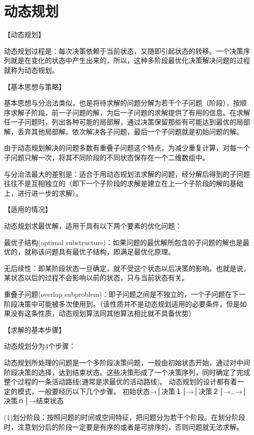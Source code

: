 \chapter{动态规划}

【动态规划】

动态规划过程是：每次决策依赖于当前状态，又随即引起状态的转移。一个决策序列就是在变化的状态中产生出来的，所以，这种多阶段最优化决策解决问题的过程就称为动态规划。

【基本思想与策略】

基本思想与分治法类似，也是将待求解的问题分解为若干个子问题（阶段），按顺序求解子阶段，前一子问题的解，为后一子问题的求解提供了有用的信息。在求解任一子问题时，列出各种可能的局部解，通过决策保留那些有可能达到最优的局部解，丢弃其他局部解。依次解决各子问题，最后一个子问题就是初始问题的解。

由于动态规划解决的问题多数有重叠子问题这个特点，为减少重复计算，对每一个子问题只解一次，将其不同阶段的不同状态保存在一个二维数组中。

与分治法最大的差别是：适合于用动态规划法求解的问题，经分解后得到的子问题往往不是互相独立的（即下一个子阶段的求解是建立在上一个子阶段的解的基础上，进行进一步的求解）。

【适用的情况】

动态规划求最优解，适用于具有以下两个要素的优化问题：
\begindot
\item 最优子结构(optimal substructure)：如果问题的最优解所包含的子问题的解也是最优的，就称该问题具有最优子结构，即满足最优化原理。
\item 无后续性：即某阶段状态一旦确定，就不受这个状态以后决策的影响。也就是说，某状态以后的过程不会影响以前的状态，只与当前状态有关。
\item 重叠子问题(overlap subproblem)：即子问题之间是不独立的，一个子问题在下一阶段决策中可能被多次使用到。（该性质并不是动态规划适用的必要条件，但是如果没有这条性质，动态规划算法同其他算法相比就不具备优势）
\myenddot

【求解的基本步骤】

动态规划分为4个步骤：

动态规划所处理的问题是一个多阶段决策问题，一般由初始状态开始，通过对中间阶段决策的选择，达到结束状态。这些决策形成了一个决策序列，同时确定了完成整个过程的一条活动路线(通常是求最优的活动路线)。
动态规划的设计都有着一定的模式，一般要经历以下几个步骤。
初始状态→│决策１│→│决策２│→…→│决策ｎ│→结束状态

(1)划分阶段：按照问题的时间或空间特征，把问题分为若干个阶段。在划分阶段时，注意划分后的阶段一定要是有序的或者是可排序的，否则问题就无法求解。

